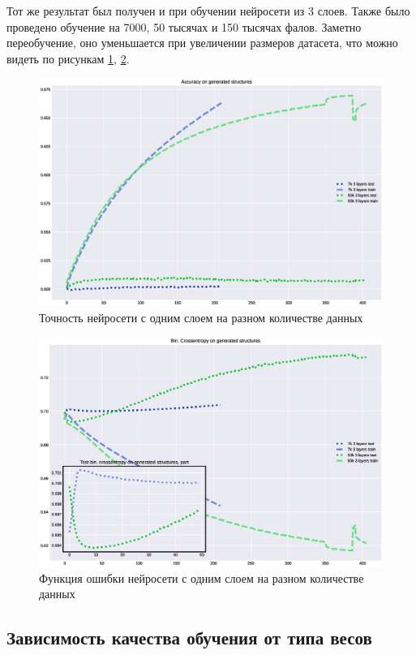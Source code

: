 \documentclass{article}
\begin{document}
Тот же результат был получен и при обучении нейросети из 3 слоев. Также было проведено обучение на 7000, 50 тысячах и 150 тысячах фалов. Заметно переобучение, оно уменьшается при увеличении размеров датасета, что можно видеть по рисункам \ref{fig:acc_3l_ndata}, \ref{fig:loss_3l_ndata}.
\begin{figure}[!htp]
\includegraphics[width=\linewidth]{imgs/acc-3l_ndata.eps}
  \caption{Точность нейросети с одним слоем на разном количестве данных}\label{fig:acc_3l_ndata}
\end{figure}

\begin{figure}[!htp]
\includegraphics[width=\linewidth]{imgs/loss-3l_ndata.eps}
  \caption{Функция ошибки нейросети с одним слоем на разном количестве данных}\label{fig:loss_3l_ndata}
\end{figure}

\subsection{Зависимость качества обучения от типа весов}
\end{document}

